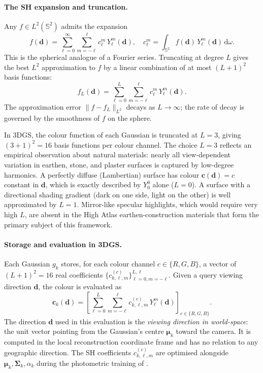 \documentclass[11pt,a4paper]{article}
\theoremstyle{plain}
\theoremstyle{definition}
\theoremstyle{remark}
\newcommand{\dd}{\mathrm{d}}
\begin{document}
\paragraph{The SH expansion and truncation.}
Any $f \in L^2(\mathbb{S}^2)$ admits the expansion
\begin{equation}
  f(\mathbf{d})
  = \sum_{\ell=0}^{\infty} \sum_{m=-\ell}^{\ell}
    c_\ell^m\,Y_\ell^m(\mathbf{d}),
  \quad
  c_\ell^m
  = \int_{\mathbb{S}^2} f(\mathbf{d})\,Y_\ell^m(\mathbf{d})\,\dd\omega.
  \label{eq:sh_expansion}
\end{equation}
This is the spherical analogue of a Fourier series. Truncating at
degree $L$ gives the best $L^2$ approximation to $f$ by a linear
combination of at most $(L+1)^2$ basis functions:
\[
  f_L(\mathbf{d})
  = \sum_{\ell=0}^{L} \sum_{m=-\ell}^{\ell}
    c_\ell^m\,Y_\ell^m(\mathbf{d}).
\]
The approximation error $\|f - f_L\|_{L^2}$ decays as $L \to \infty$;
the rate of decay is governed by the smoothness of $f$ on the sphere.

In 3DGS, the colour function of each Gaussian is truncated at $L = 3$,
giving $(3+1)^2 = 16$ basis functions per colour channel. The choice
$L = 3$ reflects an empirical observation about natural materials:
nearly all view-dependent variation in earthen, stone, and plaster
surfaces is captured by low-degree harmonics. A perfectly diffuse
(Lambertian) surface has colour $\mathbf{c}(\mathbf{d}) = c$ constant
in $\mathbf{d}$, which is exactly described by $Y_0^0$ alone ($L = 0$).
A surface with a directional shading gradient (dark on one side, light
on the other) is well approximated by $L = 1$. Mirror-like specular
highlights, which would require very high $L$, are absent in the
High Atlas earthen-construction materials that form the primary subject
of this framework.

\paragraph{Storage and evaluation in 3DGS.}
Each Gaussian $g_k$ stores, for each colour channel
$c \in \{R, G, B\}$, a vector of $(L+1)^2 = 16$ real coefficients
$\{c_{k,\ell,m}^{(c)}\}_{\ell=0,m=-\ell}^{L,\ell}$.
Given a query viewing direction $\mathbf{d}$, the colour is
evaluated as
\begin{equation}
  \mathbf{c}_k(\mathbf{d})
  = \left[
    \sum_{\ell=0}^{L}\sum_{m=-\ell}^{\ell}
      c_{k,\ell,m}^{(c)}\,Y_\ell^m(\mathbf{d})
  \right]_{c \in \{R,G,B\}}.
  \label{eq:sh_eval}
\end{equation}
The direction $\mathbf{d}$ used in this evaluation is the
\emph{viewing direction in world-space}: the unit vector pointing from
the Gaussian's centre ${\boldsymbol\mu}_k$ toward the camera. It is
computed in the local reconstruction coordinate frame and has no
relation to any geographic direction. The SH coefficients
$c_{k,\ell,m}^{(c)}$ are optimised alongside
${\boldsymbol\mu}_k, {\boldsymbol\Sigma}_k, \alpha_k$ during the
photometric training of .
\end{document}
